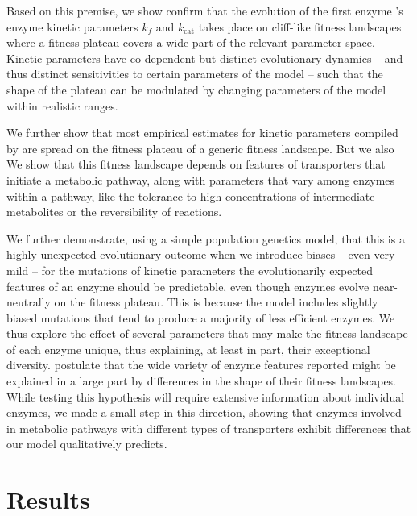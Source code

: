 \documentclass[11pt,onecolumn]{article}
\providecommand{\DIFadd}[1]{{\protect\color{blue} \sf #1}} %
\providecommand{\DIFdel}[1]{{\protect\color{red} \scriptsize #1}} %
\providecommand{\DIFaddbegin}{} %
\providecommand{\DIFaddend}{} %
\providecommand{\DIFdelbegin}{} %
\providecommand{\DIFdelend}{} %
\begin{document}
\DIFaddend Based on this premise, we \DIFdelbegin \DIFdel{show }\DIFdelend \DIFaddbegin \DIFadd{confirm }\DIFaddend that the evolution of \DIFdelbegin \DIFdel{the first enzyme 's }\DIFdelend \DIFaddbegin \DIFadd{enzyme }\DIFaddend kinetic parameters $k_f$ and $k_\text{cat}$ takes place on cliff-like fitness landscapes where a fitness plateau covers a wide part of the relevant parameter space. Kinetic parameters have co-dependent but distinct evolutionary dynamics -- and thus distinct sensitivities to certain parameters of the model -- such that the shape of the plateau can be modulated by changing parameters of the model within realistic ranges. \DIFdelbegin %

\DIFdel{We further show that most empirical estimates for kinetic parameters compiled by \citet{Bar-Even11} are spread on the fitness plateau of a generic fitness landscape.
But we also }\DIFdelend \DIFaddbegin \DIFadd{We show that this fitness landscape depends on features of transporters that initiate a metabolic pathway, along with parameters that vary among enzymes within a pathway, like the tolerance to high concentrations of intermediate metabolites or the reversibility of reactions.
}

\DIFadd{We further }\DIFaddend demonstrate, using a simple population genetics model, that \DIFdelbegin \DIFdel{this is a highly unexpected evolutionary outcome when we introduce biases -- even very mild -- for the mutations of kinetic parameters}\DIFdelend \DIFaddbegin \DIFadd{the evolutionarily expected features of an enzyme should be predictable, even though enzymes evolve near-neutrally on the fitness plateau. This is because the model includes slightly biased mutations that tend to produce a majority of less efficient enzymes}\DIFaddend . We thus \DIFdelbegin \DIFdel{explore the effect of several parameters that may make the fitness landscape of each enzyme unique, thus explaining, at least in part, their exceptional diversity. }\DIFdelend \DIFaddbegin \DIFadd{postulate that the wide variety of enzyme features reported might be explained in a large part by differences in the shape of their fitness landscapes. While testing this hypothesis will require extensive information about individual enzymes, we made a small step in this direction, showing that enzymes involved in metabolic pathways with different types of transporters exhibit differences that our model qualitatively predicts.  
}\DIFaddend 

\section{Results\label{sec:Results}}
\end{document}
